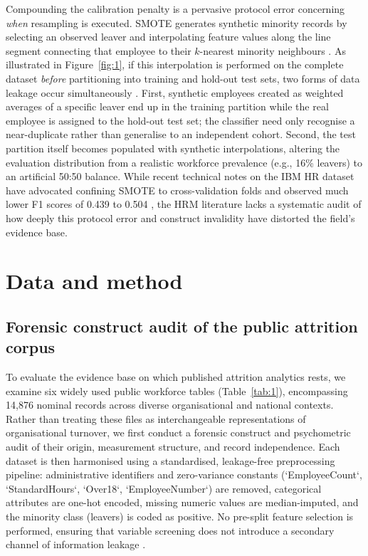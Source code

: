 \documentclass[12pt,a4paper]{article}
\begin{document}
Compounding the calibration penalty is a pervasive protocol error concerning \textit{when} resampling is executed. SMOTE generates synthetic minority records by selecting an observed leaver and interpolating feature values along the line segment connecting that employee to their $k$-nearest minority neighbours \parencite{ref5}. As illustrated in Figure~\ref{fig:1}, if this interpolation is performed on the complete dataset \textit{before} partitioning into training and hold-out test sets, two forms of data leakage occur simultaneously \parencite{ref12,ref13,ref14,ref21}. First, synthetic employees created as weighted averages of a specific leaver end up in the training partition while the real employee is assigned to the hold-out test set; the classifier need only recognise a near-duplicate rather than generalise to an independent cohort. Second, the test partition itself becomes populated with synthetic interpolations, altering the evaluation distribution from a realistic workforce prevalence (e.g., 16\% leavers) to an artificial 50:50 balance. While recent technical notes on the IBM HR dataset have advocated confining SMOTE to cross-validation folds and observed much lower F1 scores of 0.439 to 0.504 \parencite{ref15,ref16}, the HRM literature lacks a systematic audit of how deeply this protocol error and construct invalidity have distorted the field's evidence base.

\section{Data and method}
\subsection{Forensic construct audit of the public attrition corpus}
To evaluate the evidence base on which published attrition analytics rests, we examine six widely used public workforce tables (Table~\ref{tab:1}), encompassing 14,876 nominal records across diverse organisational and national contexts. Rather than treating these files as interchangeable representations of organisational turnover, we first conduct a forensic construct and psychometric audit of their origin, measurement structure, and record independence. Each dataset is then harmonised using a standardised, leakage-free preprocessing pipeline: administrative identifiers and zero-variance constants (`EmployeeCount`, `StandardHours`, `Over18`, `EmployeeNumber`) are removed, categorical attributes are one-hot encoded, missing numeric values are median-imputed, and the minority class (leavers) is coded as positive. No pre-split feature selection is performed, ensuring that variable screening does not introduce a secondary channel of information leakage \parencite{ref12,ref13}.
\end{document}
